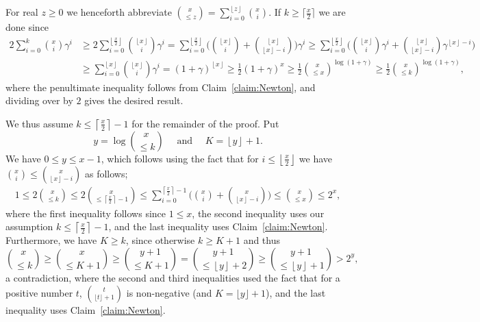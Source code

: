 \documentclass[11pt]{article}
\makeatletter
\renewenvironment{proof}[1][\proofname]
{\par\pushQED{\qed}
	\normalfont\topsep6\p@\@plus6\p@\relax\trivlist
	\item[\hskip\labelsep\bfseries#1\@addpunct{.}]
	\ignorespaces}
{\popQED\endtrivlist\@endpefalse}
\newcommand{\floor}[1]{\left\lfloor{#1}\right\rfloor}
\newcommand{\ceil}[1]{\left\lceil #1 \right\rceil}
\newcommand{\g}{\gamma}
\makeatother
\begin{document}
\begin{proof}[Proof of Lemma~\ref{lemma:113}]
	For real $z \ge 0$ we henceforth abbreviate $\binom{x}{\le z} = \sum_{i=0}^{\floor{z}} \binom{x}{i}$.
	If $k \ge \lceil \frac x 2 \rceil$ we are done since
	\begin{align*}
	2\sum_{i=0}^k \binom{x}{i}\g^i &\ge 2\sum_{i=0}^{\floor{\frac{x}{2}}} \binom{\floor{x}}{i}\g^i
	= \sum_{i=0}^{\floor{\frac{x}{2}}} \bigg(\binom{\floor{x}}{i}+\binom{\floor{x}}{\floor{x}-i}\bigg)\g^i
	\ge \sum_{i=0}^{\floor{\frac{x}{2}}} \bigg( \binom{\floor{x}}{i}\g^i+\binom{\floor{x}}{\floor{x}-i}\g^{\floor{x}-i} \bigg)\\
	&\ge \sum_{i=0}^{\floor{x}} \binom{\floor{x}}{i}\g^i = (1+\g)^{\floor{x}}
	\ge \frac12 (1+\g)^x \ge \frac12\binom{x}{\le x}^{\log(1+\g)}  \ge \frac12\binom{x}{\le k}^{\log(1+\g)} ,
	\end{align*}
	where the penultimate inequality follows from Claim~\ref{claim:Newton},
	and dividing over by $2$ gives the desired result.
	
	We thus assume $k \le \ceil{\frac{x}{2}}-1$ for the remainder of the proof.
	Put
	$$y=\log \binom{x}{\le k} \quad\text{ and }\quad K=\floor{y}+1.$$
	We have $0\le y \le x-1$, which follows using the fact that for $i \le \floor{\frac{x}{2}}$ we have $\binom{x}{i} \le \binom{x}{\floor{x}-i}$ as follows;
	\begin{align*}
	1\le 2\binom{x}{\le k} \le 2\binom{x}{\le\ceil{\frac{x}{2}}-1} \le \sum_{i=0}^{\ceil{\frac{x}{2}}-1} \bigg( \binom{x}{i} + \binom{x}{\floor{x}-i} \bigg) \le
	\binom{x}{\le x} \le 2^x,
	\end{align*}
	where the first inequality follows since $1 \le x$, the second inequality uses our assumption $k \le \ceil{\frac{x}{2}}-1$, and the last inequality uses Claim~\ref{claim:Newton}. 
	Furthermore, we have $K \ge k$, since otherwise $k \ge K+1$ and thus
	$$\binom{x}{\le k} \ge \binom{x}{\le K+1} \ge \binom{y+1}{\le K+1} = \binom{y+1}{\le \floor{y}+2} \ge \binom{y+1}{\le \floor{y}+1} > 2^y,$$
	a contradiction, where the second and third inequalities used the fact that for a positive number $t$, $\binom {t} {\lfloor t \rfloor + 1}$ is non-negative (and $K = \lfloor y \rfloor + 1$), and the last inequality uses Claim~\ref{claim:Newton}. 
	

\end{proof}
\end{document}
